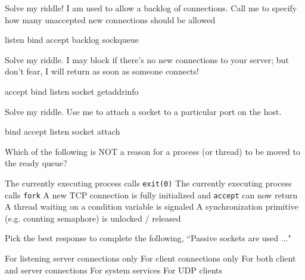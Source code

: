 \variant
Solve my riddle! I am used to allow a backlog of connections. Call me to specify how many unaccepted new connections should be allowed
\begin{answers}
\correctanswer listen
\answer bind
\answer accept
\answer backlog
\answer sockqueue
\end{answers}
\begin{solution}
\end{solution}

\variant
Solve my riddle. I may block if there's no new connections to your server; but don't fear, I will return as soon as someone connects!
\begin{answers}
\correctanswer accept
\answer bind
\answer listen
\answer socket
\answer getaddrinfo
\end{answers}
\begin{solution}
\end{solution}

\variant
Solve my riddle. Use me to attach a socket to a particular port on the host.
\begin{answers}
\correctanswer bind
\answer accept
\answer listen
\answer socket
\answer attach
\end{answers}
\begin{solution}
\end{solution}


\variant
Which of the following is NOT a reason for a process (or thread) to be moved to the ready queue?
\begin{answers}
\correctanswer The currently executing process calls {\tt exit(0)}
\answer The currently executing process calls {\tt fork}
\answer A new TCP connection is fully initialized and {\tt accept} can now return
\answer A thread waiting on a condition variable is signaled
\answer A synchronization primitive (e.g. counting semaphore) is unlocked / released
\end{answers}
\begin{solution}
\end{solution}


\variant
Pick the best response to complete the following, ``Passive sockets are used ..."
\begin{answers}
\correctanswer For listening server connections only
\answer For client connections only
\answer For both client and server connections
\answer For system services
\answer For UDP clients
\end{answers}
\begin{solution}
\end{solution}


